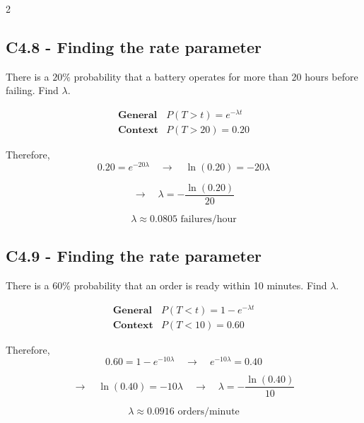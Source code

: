 \begin{multicols}{2}

\subsection*{C4.8 - Finding the rate parameter}
\label{subsec:c4-find-rate-battery}

There is a $20\%$ probability that a battery operates for more than
20 hours before failing. Find $\lambda$.

\[
\begin{array}{c|c}
	\textbf{General} & P(T>t)=e^{-\lambda t}\\[6pt]
	\textbf{Context} & P(T>20)=0.20
\end{array}
\]

Therefore,
\[
0.20=e^{-20\lambda}
\quad\longrightarrow\quad
\ln(0.20)=-20\lambda
\]

\[
\longrightarrow\quad
\lambda=-\frac{\ln(0.20)}{20}
\]

\[
\boxed{\lambda\approx0.0805\text{ failures/hour}}
\]



\subsection*{C4.9 - Finding the rate parameter}
\label{subsec:c4-find-rate-preparation}

There is a $60\%$ probability that an order is ready within 10 minutes.
Find $\lambda$.

\[
\begin{array}{c|c}
	\textbf{General} & P(T<t)=1-e^{-\lambda t}\\[6pt]
	\textbf{Context} & P(T<10)=0.60
\end{array}
\]

Therefore,
\[
0.60=1-e^{-10\lambda}
\quad\longrightarrow\quad
e^{-10\lambda}=0.40
\]

\[
\longrightarrow\quad
\ln(0.40)=-10\lambda
\quad\longrightarrow\quad
\lambda=-\frac{\ln(0.40)}{10}
\]

\[
\boxed{\lambda\approx0.0916\text{ orders/minute}}
\]




\end{multicols}
